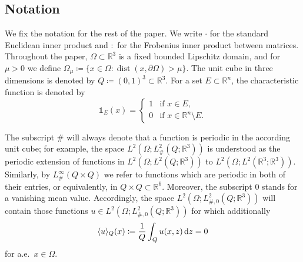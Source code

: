 \documentclass[reqno,11pt]{amsart}
\numberwithin{equation}{section}
\theoremstyle{thmlemcorr}
\numberwithin{theorem}{section}
\theoremstyle{thmlemcorr*}
\theoremstyle{defi}
\theoremstyle{remexample}
\theoremstyle{ass}
\newcommand{\R}{\mathbb{R}}
\DeclarePairedDelimiter{\inner}{\langle}{\rangle}
\newcommand{\1}{\mathds{1}}
\newcommand{\Om}{\Omega}
\newcommand{\dl}{\,\mathrm{d}}
\begin{document}
     



    \subsection*{Notation}\label{Sec:Notation}

We fix the notation for the rest of the paper. We write \(\cdot\) for the standard Euclidean inner product and \(\colon\) for the Frobenius inner product between matrices. 
Throughout the paper, 
$\Omega \subset \R^3$ is a fixed bounded Lipschitz domain, and  for \(\mu>0\) we define \(\Om_{\mu}\coloneqq \{x \in \Omega : \operatorname{dist}(x, \partial \Om) > \mu\}\). The unit cube in three dimensions is denoted by \(Q\coloneqq (0,1)^3\subset \R^3\).  For a set $E \subset \R^n$, the characteristic function is denoted by
\[
\mathds{1}_{E}(x)=\begin{cases}
    1 &\text{if $x \in E$},\\
    0 &\text{if $x \in \R^n \setminus E$.}
\end{cases}
\]


The subscript \(\#\) will always denote that a function is periodic in the according unit cube; for example, the space \(L^2(\Om;L^2_\#(Q;\R^3))\) is understood as the periodic extension of functions in \(L^2(\Om;L^2(Q;\R^3))\) to \(L^2(\Om;L^2(\R^3;\R^3))\). Similarly, by \(L^\infty_{\#}(Q\times Q)\) we refer to functions which are periodic in both of their entries, or equivalently, in \(Q\times Q\subset \R^6\). Moreover, the subscript \(0\) stands for a vanishing mean value. Accordingly, the space \(L^2(\Om;L^2_{\#,0}(Q;\R^3))\) will contain those functions \(u\in L^2(\Om;L^2_{\#,0}(Q;\R^3))\) for which additionally
\begin{equation*}
    \inner{u}_{Q}(x)
    \coloneqq \frac{1}{Q}\int_Q u(x,z) \dl z = 0
\end{equation*}
for a.e.~\(x\in \Om\). 
\end{document}
